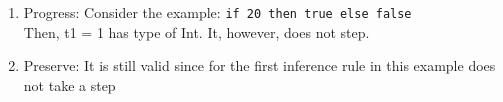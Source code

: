 \documentclass{article}
\begin{document}
\begin{description}
\begin{enumerate}
                \begin{enumerate}
                        \item Progress: Consider the example: \verb|if 20 then true else false |\\ Then, t1 = 1 has type of Int.
                        It, however, does not step.
                        \item Preserve: It is still valid since for the first inference rule in this example does not take a step
                    \end{enumerate}

            \end{enumerate}




%
%
%

\end{description}
\end{document}
